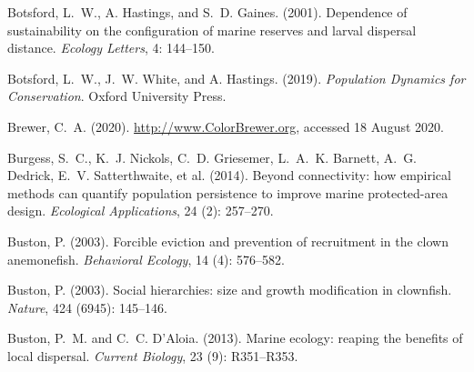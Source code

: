 \documentclass[12pt, oneside]{article}   	%
\begin{document}
\begin{thebibliography}{66}

Botsford, L.~W., A. Hastings, and S.~D. Gaines. (2001).
\newblock Dependence of sustainability on the configuration of marine reserves
  and larval dispersal distance.
\newblock \emph{Ecology Letters}, 4: 144--150.

Botsford, L.~W., J.~W. White, and A. Hastings. (2019).
\newblock \emph{Population Dynamics for Conservation}.
\newblock Oxford University Press.

Brewer, C.~A. (2020). 
\newblock \url{http://www.ColorBrewer.org},
\newblock accessed 18 August 2020.

Burgess, S.~C., K.~J. Nickols, C.~D. Griesemer, L.~A.~K. Barnett,
  A.~G. Dedrick, E.~V. Satterthwaite, et al. (2014).
\newblock Beyond connectivity: how empirical methods can quantify population
  persistence to improve marine protected-area design.
\newblock \emph{Ecological Applications}, 24 (2): 257--270.

Buston, P. (2003{}).
\newblock Forcible eviction and prevention of recruitment in the clown
  anemonefish.
\newblock \emph{Behavioral Ecology}, 14 (4): 576--582.

Buston, P. (2003{}).
\newblock Social hierarchies: size and growth modification in clownfish.
\newblock \emph{Nature}, 424 (6945): 145--146.

Buston, P.~M. and C.~C. D'Aloia. (2013).
\newblock Marine ecology: reaping the benefits of local dispersal.
\newblock \emph{Current Biology}, 23 (9): R351--R353.


\end{thebibliography}
\end{document}
